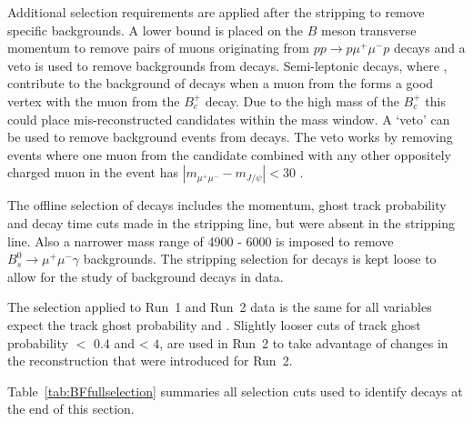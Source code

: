 Additional selection requirements are applied after the stripping to remove specific backgrounds. A lower bound is placed on the $B$ meson transverse momentum to remove pairs of muons originating from $pp \to p\mu^{+}\mu^{-} p$ decays and a \jpsi veto is used to remove backgrounds from \bcjpsimunu decays. Semi-leptonic \bcjpsimunu decays, where \jpsimumu, contribute to the background of \bmumu decays when a muon from the \jpsi forms a good vertex with the muon from the $B_{c}^{+}$ decay. Due to the high mass of the $B_{c}^{+}$ this could place mis-reconstructed candidates within the \bs mass window. A `\jpsi veto' can be used to remove background events from \bcjpsimunu decays. The veto works by removing events where one muon from the \bmumu candidate combined with any other oppositely charged muon in the event has $|m_{\mu^{+}\mu^{-}} - m_{J/\psi}| < 30$  \mevcc. %

The offline selection of \bmumu decays includes the momentum, ghost track probability and decay time cuts made in the \bhh stripping line, but were absent in the \bmumu stripping line. Also a narrower mass range of 4900 - 6000 \mevcc is imposed to remove $B_{s}^{0} \to \mu^{+} \mu^{-} \gamma$ backgrounds. The stripping selection for \bmumu decays is kept loose to allow for the study of background decays in data. 

The selection applied to Run~1 and Run~2 data is the same for all variables expect the track ghost probability and \chitrk. Slightly looser cuts of track ghost probability $<$ 0.4 and \chitrk < $4$, are used in Run~2 to take advantage of changes in the reconstruction that were introduced for Run~2. 

Table~\ref{tab:BFfullselection} summaries all selection cuts used to identify \bmumu %
decays at the end of this section.

